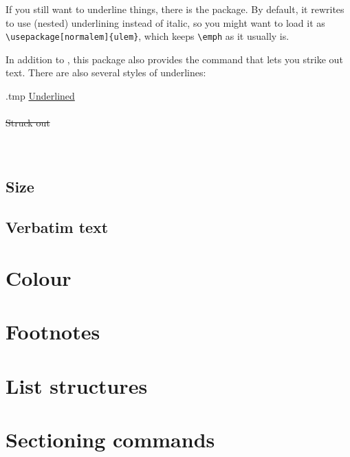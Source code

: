 If you still want to underline things, there is the  package.
By default, it rewrites  to use (nested) underlining instead of italic,
so you might want to load it as \verb|\usepackage[normalem]{ulem}|,
which keeps \verb|\emph| as it usually is.

In addition to , this package also provides the  command
that lets you strike out text.
There are also several styles of underlines:
%
\begin{VerbatimOut}{\jobname.tmp}
\uline{Underlined}\\
\\
\sout{Struck out}\\
\\
\\
\end{VerbatimOut}
\ShowExample


\subsection{Size}

\subsection{Verbatim text}



%
%
%
\section{Colour}\label{sec:colour}


%
%
%
\section{Footnotes}



\section{List structures}



%
%
%
\section{Sectioning commands}

